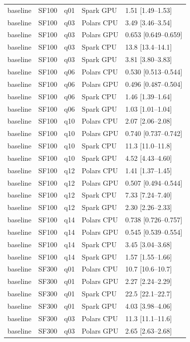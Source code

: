 \begin{longtable}{lllll}
baseline & SF100 & q01 & Spark GPU & 1.51 [1.49--1.53] \\
baseline & SF100 & q03 & Polars CPU & 3.49 [3.46--3.54] \\
baseline & SF100 & q03 & Polars GPU & 0.653 [0.649--0.659] \\
baseline & SF100 & q03 & Spark CPU & 13.8 [13.4--14.1] \\
baseline & SF100 & q03 & Spark GPU & 3.81 [3.80--3.83] \\
baseline & SF100 & q06 & Polars CPU & 0.530 [0.513--0.544] \\
baseline & SF100 & q06 & Polars GPU & 0.496 [0.487--0.504] \\
baseline & SF100 & q06 & Spark CPU & 1.46 [1.39--1.64] \\
baseline & SF100 & q06 & Spark GPU & 1.03 [1.01--1.04] \\
baseline & SF100 & q10 & Polars CPU & 2.07 [2.06--2.08] \\
baseline & SF100 & q10 & Polars GPU & 0.740 [0.737--0.742] \\
baseline & SF100 & q10 & Spark CPU & 11.3 [11.0--11.8] \\
baseline & SF100 & q10 & Spark GPU & 4.52 [4.43--4.60] \\
baseline & SF100 & q12 & Polars CPU & 1.41 [1.37--1.45] \\
baseline & SF100 & q12 & Polars GPU & 0.507 [0.494--0.544] \\
baseline & SF100 & q12 & Spark CPU & 7.33 [7.24--7.40] \\
baseline & SF100 & q12 & Spark GPU & 2.30 [2.26--2.33] \\
baseline & SF100 & q14 & Polars CPU & 0.738 [0.726--0.757] \\
baseline & SF100 & q14 & Polars GPU & 0.545 [0.539--0.554] \\
baseline & SF100 & q14 & Spark CPU & 3.45 [3.04--3.68] \\
baseline & SF100 & q14 & Spark GPU & 1.57 [1.55--1.66] \\
baseline & SF300 & q01 & Polars CPU & 10.7 [10.6--10.7] \\
baseline & SF300 & q01 & Polars GPU & 2.27 [2.24--2.29] \\
baseline & SF300 & q01 & Spark CPU & 22.5 [22.1--22.7] \\
baseline & SF300 & q01 & Spark GPU & 4.03 [3.98--4.06] \\
baseline & SF300 & q03 & Polars CPU & 11.3 [11.1--11.6] \\
baseline & SF300 & q03 & Polars GPU & 2.65 [2.63--2.68] \\

\end{longtable}
